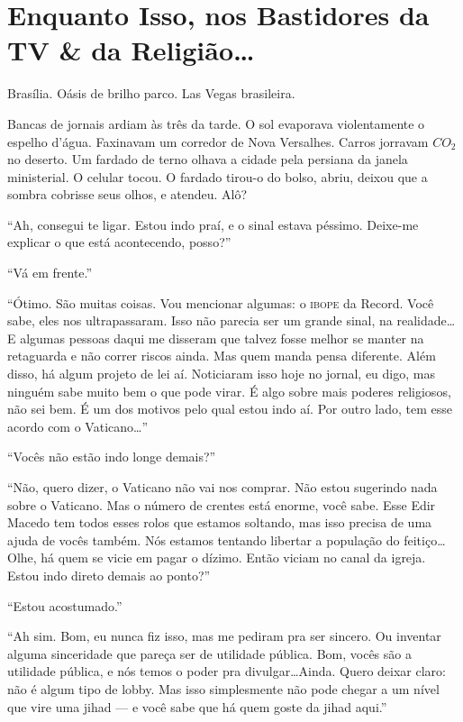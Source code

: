 \chapter{Enquanto Isso, nos Bastidores da TV \& da Religião\ldots}

Brasília. Oásis de brilho parco. Las Vegas brasileira.

Bancas de jornais ardiam às três da tarde. O sol evaporava violentamente o espelho d’água. Faxinavam um corredor de Nova Versalhes. Carros jorravam $CO_{2}$ no deserto. Um fardado de terno olhava a cidade pela persiana da janela ministerial. O celular tocou. O fardado tirou-o do bolso, abriu, deixou que a sombra cobrisse seus olhos, e atendeu. Alô?

``Ah, consegui te ligar. Estou indo praí, e o sinal estava péssimo. Deixe-me explicar o que está acontecendo, posso?''

``Vá em frente.''

``Ótimo. São muitas coisas. Vou mencionar algumas: o \textsc{ibope} da Record. Você sabe, eles nos ultrapassaram. Isso não parecia ser um grande sinal, na realidade\ldots E algumas pessoas daqui me disseram que talvez fosse melhor se manter na retaguarda e não correr riscos ainda. Mas quem manda pensa diferente. Além disso, há algum projeto de lei aí. Noticiaram isso hoje no jornal, eu digo, mas ninguém sabe muito bem o que pode virar. É algo sobre mais poderes religiosos, não sei bem. É um dos motivos pelo qual estou indo aí. Por outro lado, tem esse acordo com o Vaticano\ldots''

``Vocês não estão indo longe demais?''

``Não, quero dizer, o Vaticano não vai nos comprar. Não estou sugerindo nada sobre o Vaticano. Mas o número de crentes está enorme, você sabe. Esse Edir Macedo tem todos esses rolos que estamos soltando, mas isso precisa de uma ajuda de vocês também. Nós estamos tentando libertar a população do feitiço\ldots Olhe, há quem se vicie em pagar o dízimo. Então viciam no canal da igreja. Estou indo direto demais ao ponto?''

``Estou acostumado.''

``Ah sim. Bom, eu nunca fiz isso, mas me pediram pra ser sincero. Ou inventar alguma sinceridade que pareça ser de utilidade pública. Bom, vocês são a utilidade pública, e nós temos o poder pra divulgar\ldots Ainda. Quero deixar claro: não é algum tipo de lobby. Mas isso simplesmente não pode chegar a um nível que vire uma jihad --- e você sabe que há quem goste da jihad aqui.''

